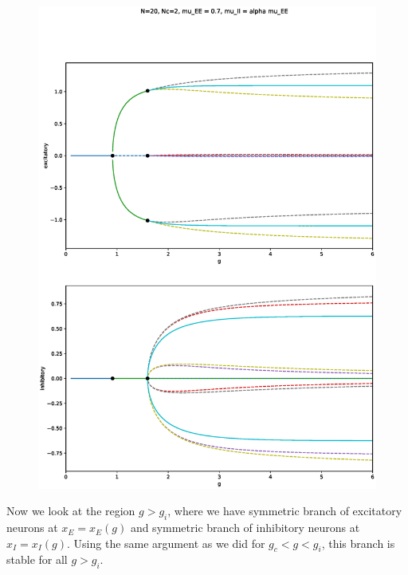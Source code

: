 \documentclass[11pt,reqno]{amsart}
\begin{document}
\begin{figure}[H]
\centering
\includegraphics[width=14cm]{images/BD2_c20_E07.eps}
\end{figure}

Now we look at the region $g > g_i$, where we have symmetric branch of excitatory neurons at $x_E = x_E(g)$ and symmetric branch of inhibitory neurons at $x_I = x_I(g)$. Using the same argument as we did for $g_c < g < g_i$, this branch is stable for all $g > g_i$.
\end{document}
